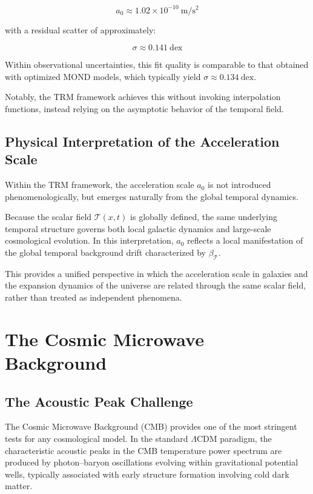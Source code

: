 \documentclass[11pt]{article}
\begin{document}
	\begin{equation}
		a_0 \approx 1.02 \times 10^{-10}\ \mathrm{m/s^2}
	\end{equation}

	with a residual scatter of approximately:

	\begin{equation}
		\sigma \approx 0.141\ \mathrm{dex}
	\end{equation}

	Within observational uncertainties, this fit quality is comparable to that obtained with optimized MOND models, which typically yield $\sigma \approx 0.134\ \mathrm{dex}$.

	Notably, the TRM framework achieves this without invoking interpolation functions, instead relying on the asymptotic behavior of the temporal field.

	\subsection{Physical Interpretation of the Acceleration Scale}

	Within the TRM framework, the acceleration scale $a_0$ is not introduced phenomenologically, but emerges naturally from the global temporal dynamics.

	Because the scalar field $\mathcal{T}(x,t)$ is globally defined, the same underlying temporal structure governs both local galactic dynamics and large-scale cosmological evolution. In this interpretation, $a_0$ reflects a local manifestation of the global temporal background drift characterized by $\beta_{\mathcal{T}}$.

	This provides a unified perspective in which the acceleration scale in galaxies and the expansion dynamics of the universe are related through the same scalar field, rather than treated as independent phenomena.

	\section{The Cosmic Microwave Background}

	\subsection{The Acoustic Peak Challenge}

	The Cosmic Microwave Background (CMB) provides one of the most stringent tests for any cosmological model. In the standard $\Lambda$CDM paradigm, the characteristic acoustic peaks in the CMB temperature power spectrum are produced by photon--baryon oscillations evolving within gravitational potential wells, typically associated with early structure formation involving cold dark matter.
\end{document}
